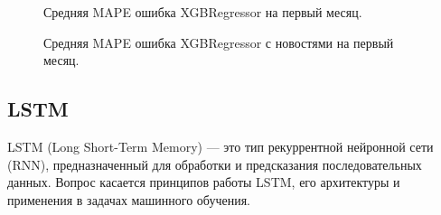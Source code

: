 \documentclass[12pt, a4paper]{article}
\begin{document}
\begin{figure}[!h]
\caption{Средняя MAPE ошибка XGBRegressor на первый месяц.}
\label{fig:xgboost}
\end{figure}
\begin{figure}[H]
\caption{Средняя MAPE ошибка XGBRegressor с новостями на первый месяц.}
\label{fig:xgboost_with_news}
\end{figure}

\subsection{LSTM}

LSTM (Long Short-Term Memory) — это тип рекуррентной нейронной сети (RNN), предназначенный для обработки и предсказания последовательных данных. Вопрос касается принципов работы LSTM, его архитектуры и применения в задачах машинного обучения.
\end{document}
